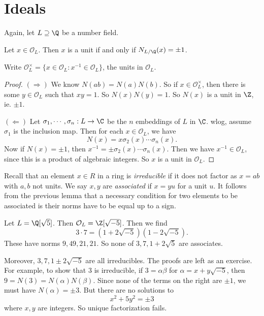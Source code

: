 \documentclass[a4paper]{article}
\begin{document}
\section{Ideals}
Again, let $L \supseteq \Q$ be a number field.

\begin{lemma}
  Let $x \in \mathcal{O}_L$. Then $x$ is a unit if and only if $N_{L/\Q}(x) = \pm 1$.
\end{lemma}

\begin{notation}
  Write $\mathcal{O}_L^\times = \{x \in \mathcal{O}_L: x^{-1} \in \mathcal{O}_L\}$, the units in $\mathcal{O}_L$.
\end{notation}

\begin{proof}
  $(\Rightarrow)$ We know $N(a b) = N(a)N(b)$. So if $x \in \mathcal{O}_L^\times$, then there is some $y \in \mathcal{O}_L$ such that $xy = 1$. So $N(x) N(y) = 1$. So $N(x)$ is a unit in $\Z$, ie. $\pm 1$.

  $(\Leftarrow)$ Let $\sigma_1, \cdots, \sigma_n: L \to \C$ be the $n$ embeddings of $L$ in $\C$. wlog, assume $\sigma_1$ is the inclusion map. Then for each $x \in \mathcal{O}_L$, we have
  \[
    N(x) = x \sigma_2(x) \cdots \sigma_n(x).
  \]
  Now if $N(x) = \pm 1$, then $x^{-1} = \pm \sigma_2(x) \cdots \sigma_n(x)$. Then we have $x^{-1} \in \mathcal{O}_L$, since this is a product of algebraic integers. So $x$ is a unit in $\mathcal{O}_L$.
\end{proof}

Recall that an element $x \in R$ in a ring is \emph{irreducible} if it does not factor as $x = ab$ with $a, b$ not units. We say $x, y$ are \emph{associated} if $x = yu$ for a unit $u$. It follows from the previous lemma that a necessary condition for two elements to be associated is their norms have to be equal up to a sign.

\begin{eg}
  Let $L = \Q[\sqrt{5}]$. Then $\mathcal{O}_L = \Z[\sqrt{-5}]$. Then we find
  \[
    3 \cdot 7 = (1 + 2\sqrt{-5})(1 - 2\sqrt{-5}).
  \]
  These have norms $9, 49, 21, 21$. So none of $3, 7, 1 + 2\sqrt{5}$ are associates.

  Moreover, $3, 7, 1 \pm 2\sqrt{-5}$ are all irreducibles. The proofs are left as an exercise. For example, to show that $3$ is irreducible, if $3 = \alpha \beta$ for $\alpha = x + y \sqrt{-5}$, then $9 = N(3) = N(\alpha) N(\beta)$. Since none of the terms on the right are $\pm 1$, we must have $N(\alpha) = \pm 3$. But there are no solutions to
  \[
    x^2 + 5y^2 = \pm 3
  \]
  where $x, y$ are integers. So unique factorization fails.
\end{eg}
\end{document}
